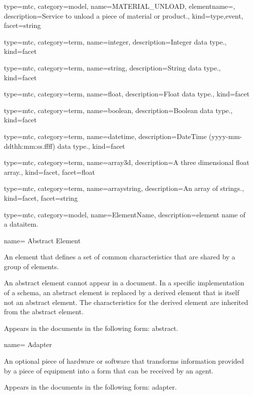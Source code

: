 {
  type=mtc,
  category=model,
  name={MATERIAL\_UNLOAD},
  elementname=,
  description={Service to unload a piece of material or product.},
  kind={type,event},
  facet={\gls{string}}
}


{
  type=mtc,
  category=term,
  name={integer},
  description={Integer data type.},
  kind={facet}
}


{
  type=mtc,
  category=term,
  name={string},
  description={String data type.},
  kind={facet}
}


{
  type=mtc,
  category=term,
  name={float},
  description={Float data type.},
  kind={facet}
}


{
  type=mtc,
  category=term,
  name={boolean},
  description={Boolean data type.},
  kind={facet}
}


{
  type=mtc,
  category=term,
  name={datetime},
  description={DateTime (yyyy-mm-ddthh:mm:ss.ffff) data type.},
  kind={facet}
}


{
  type=mtc,
  category=term,
  name={array3d},
  description={A three dimensional \gls{float} array.},
  kind={facet},
  facet={\gls{float}}
}

{
  type=mtc,
  category=term,
  name={arraystring},
  description={An array of \glspl{string}.},
  kind={facet},
  facet={\gls{string}}
}

{
  type=mtc,
  category=model,
  name={ElementName},
  description={\gls{element name} of a \gls{dataitem}.}
}

{
  name= {Abstract Element}
}
{
  An element that defines a set of common characteristics that are shared by a group of elements.
  
  An abstract element cannot appear in a document. In a specific implementation of a schema, an abstract element is replaced by a derived element that is itself not an abstract element. The characteristics for the derived element are inherited from the abstract element. 
  
  Appears in the documents in the following form: abstract.
}


{
  name= {Adapter}
}
{
  An optional piece of hardware or software that transforms information provided by a piece of equipment into a form that can be received by an \gls{agent}.

  Appears in the documents in the following form: adapter.
}


